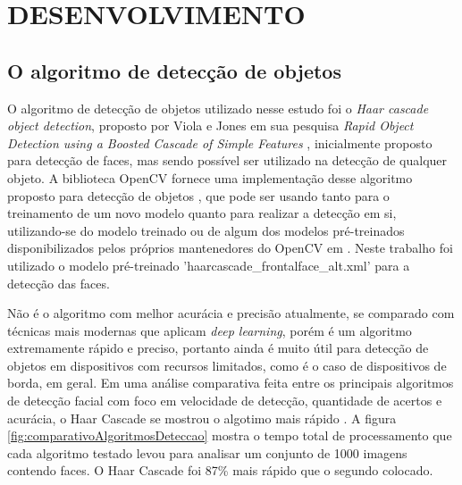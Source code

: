 \chapter{\MakeUppercase{Desenvolvimento}}
\thispagestyle{plain}
\label{cap:desenvolvimento}

\vspace{-3em} %

\graphicspath{{./Cap3_Desenvolvimento/Figures/}}

\section{O algoritmo de detecção de objetos}

O algoritmo de detecção de objetos utilizado nesse estudo foi o \textit{Haar cascade object detection}, proposto por Viola e Jones em sua pesquisa \textit{Rapid Object Detection using a Boosted Cascade of Simple Features} \cite{Viola2001}, inicialmente proposto para detecção de faces, mas sendo possível ser utilizado na detecção de qualquer objeto. A biblioteca OpenCV fornece uma implementação desse algoritmo proposto para detecção de objetos \cite{OpenCV-CascadeClassifier}, que pode ser usando tanto para o treinamento de um novo modelo quanto para realizar a detecção em si, utilizando-se do modelo treinado ou de algum dos modelos pré-treinados disponibilizados pelos próprios mantenedores do OpenCV em \cite{OpenCV-PreTrainedModels}. Neste trabalho foi utilizado o modelo pré-treinado 'haarcascade\_frontalface\_alt.xml' para a detecção das faces. 

Não é o algoritmo com melhor acurácia e precisão atualmente, se comparado com técnicas mais modernas que aplicam \textit{deep learning}, porém é um algoritmo extremamente rápido e preciso, portanto ainda é muito útil para detecção de objetos em dispositivos com recursos limitados, como é o caso de dispositivos de borda, em geral. Em uma análise comparativa feita entre os principais algoritmos de detecção facial com foco em velocidade de detecção, quantidade de acertos e acurácia, o Haar Cascade se mostrou o algotimo mais rápido \cite{Carvalho2022}. A figura \ref{fig:comparativoAlgoritmosDeteccao} mostra o tempo total de processamento que cada algoritmo testado levou para analisar um conjunto de 1000 imagens contendo faces. O Haar Cascade foi 87\% mais rápido que o segundo colocado.

